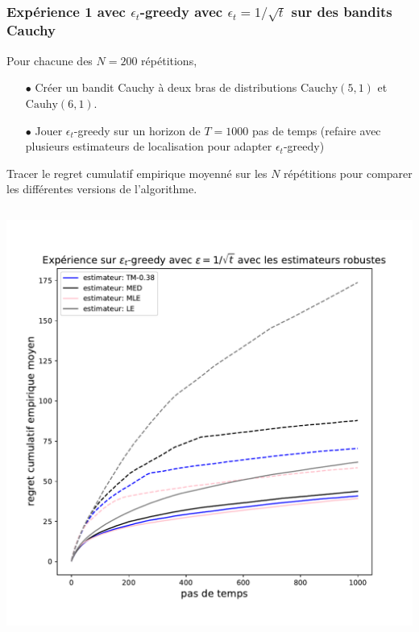 \documentclass[8pt,sans,aspectratio=169]{beamer}
\begin{document}
\begin{frame}

\frametitle{Expérience 1 avec $\epsilon_t$-greedy avec $\epsilon_t=1/\sqrt{t}$ sur des bandits Cauchy}

\pause

Pour chacune des $N=200$ répétitions,\\

\pause

\begin{itemize}

\item[$\bullet$] Créer un bandit Cauchy à deux bras de distributions $\mathrm{Cauchy}(5,1)$ et $\mathrm{Cauhy}(6,1).$

\pause
\item[$\bullet$] Jouer $\epsilon_t$-greedy sur un horizon de $T=1000$ pas de temps (refaire avec plusieurs estimateurs de localisation pour adapter $\epsilon_t$-greedy)
\end{itemize}

\pause

Tracer le regret cumulatif empirique moyenné sur les $N$ répétitions pour comparer les différentes versions de l'algorithme.

\pause
\vspace*{-0.5cm}

\begin{columns}[T]

\begin{column}{0.5\linewidth}

\begin{center}
\includegraphics[scale=0.3]{experience-epsilon-t-greedy.pdf}
\end{center}


\end{column}
\end{columns}
\end{frame}
\end{document}

